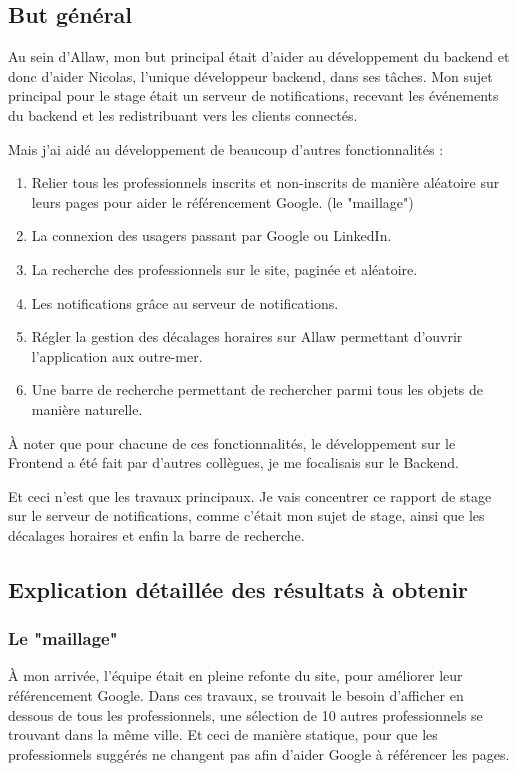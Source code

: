 
\subsection{But général}

Au sein d'Allaw, mon but principal était d'aider au développement du backend
et donc d'aider Nicolas, l'unique développeur backend, dans ses tâches. Mon
sujet principal pour le stage était un serveur de notifications, recevant les
événements du backend et les redistribuant vers les clients connectés.

Mais j'ai aidé au développement de beaucoup d'autres fonctionnalités :

\begin{enumerate}
    \item Relier tous les professionnels inscrits et non-inscrits de manière aléatoire sur
          leurs pages pour aider le référencement Google. (le "maillage")
	\item La connexion des usagers passant par Google ou LinkedIn.
    \item La recherche des professionnels sur le site, paginée et aléatoire.
	\item Les notifications grâce au serveur de notifications.
	\item Régler la gestion des décalages horaires sur Allaw permettant d'ouvrir l'application aux outre-mer.
	\item Une barre de recherche permettant de rechercher parmi tous les objets de manière naturelle.
\end{enumerate}

À noter que pour chacune de ces fonctionnalités, le développement sur le {\bt
Frontend} a été fait par d'autres collègues, je me focalisais sur le {\bt
Backend}.

Et ceci n'est que les travaux principaux. Je vais concentrer ce rapport de stage
sur le serveur de notifications, comme c'était mon sujet de stage, ainsi que les
décalages horaires et enfin la barre de recherche.

\subsection{Explication détaillée des résultats à obtenir}

\subsubsection{Le "maillage"}

À mon arrivée, l'équipe était en pleine refonte du site, pour améliorer leur
référencement Google. Dans ces travaux, se trouvait le besoin d'afficher en
dessous de tous les professionnels, une sélection de 10 autres professionnels
se trouvant dans la même ville. Et ceci de manière statique, pour que les
professionnels suggérés ne changent pas afin d'aider Google à référencer les
pages.

